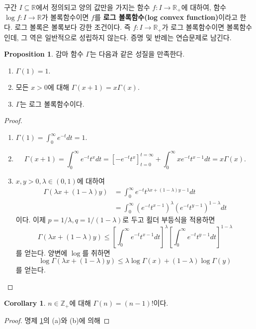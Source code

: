 \documentclass[11pt]{book}
\numberwithin{equation}{chapter}
\def\ZZ{\mathbb{Z}}
\def\RR{\mathbb{R}}
\newcommand{\sqbracket}[1]{\left[#1\right]}
\theoremstyle{definition}
\newtheorem{cor}[thm]{Corollary}
\newtheorem{prop}[thm]{Proposition}
\newenvironment{enum}
	{\begin{enumerate}[label=(\alph*), leftmargin=2\parindent]}
	{\end{enumerate}}
\begin{document}
구간 \(I \subseteq \RR\)에서 정의되고 양의 값만을 가지는 함수 \(f : I \to \RR_+\)에 대하여, 함수 \(\log f : I \to \RR\)가 볼록함수이면 \(f\)를 \textbf{로그 볼록함수(log convex function)}이라고 한다. 로그 볼록은 볼록보다 강한 조건이다. 즉 \(f : I \to \RR_+\)가 로그 볼록함수이면 볼록함수인데, 그 역은 일반적으로 성립하지 않는다. 증명 및 반례는 연습문제로 남긴다.

\begin{prop} \label{14.2.3}
    감마 함수 \(\Gamma\)는 다음과 같은 성질을 만족한다.
    \begin{enum}
        \item \(\Gamma(1) = 1\).
        \item 모든 \(x > 0\)에 대해 \(\Gamma(x+1) = x\Gamma(x)\).
        \item \(\Gamma\)는 로그 볼록함수이다.
    \end{enum}
\end{prop}
\begin{proof}
    \quad

    \begin{enum}
        \item \(\Gamma(1) = \int_0^\infty e^{-t} dt = 1\).
        \item 
        \[
        \Gamma(x+1) = \int_0^\infty e^{-t}t^x dt = \sqbracket{-e^{-t} t^x}_{t=0}^{t=\infty} + \int_0^\infty x e^{-t} t^{x-1} dt = x \Gamma(x).
        \]
        \item \(x, y > 0, \lambda \in (0, 1)\)에 대하여
        \begin{align*}
            \Gamma(\lambda x + (1-\lambda)y) &= \int_0^\infty e^{-t} t^{\lambda x + (1-\lambda)y-1} dt\\
            &= \int_0^\infty (e^{-t} t^{x-1})^\lambda (e^{-t} t^{y-1})^{1-\lambda} dt
        \end{align*}
        이다. 이제 \(p = 1/\lambda, q = 1/(1-\lambda)\)로 두고 횔더 부등식을 적용하면
        \[
            \Gamma(\lambda x + (1-\lambda)y) \le \sqbracket{\int_0^\infty e^{-t} t^{x-1} dt}^{\lambda} \sqbracket{\int_0^\infty e^{-t} t^{y-1} dt}^{1-\lambda}
        \]
        를 얻는다. 양변에 \(\log\)를 취하면
        \[
        \log \Gamma (\lambda x + (1-\lambda)y) \le \lambda \log \Gamma(x) + (1-\lambda) \log \Gamma(y)
        \]
        를 얻는다.
    \end{enum}
\end{proof}

\begin{cor}
    \(n \in \ZZ_+\)에 대해 \(\Gamma(n) = (n-1)!\)이다.
\end{cor}
\begin{proof}
    명제 \ref{14.2.3}의 (a)와 (b)에 의해
\end{proof}
\end{document}
